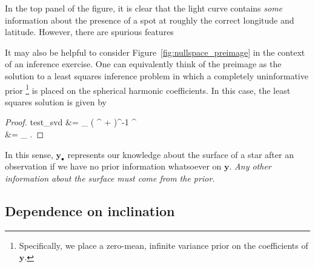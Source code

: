 \documentclass[modern]{aastex62}
\begin{document}
In the top panel of the figure, it is clear that the light curve
contains \emph{some} information about the presence of a spot at roughly the
correct longitude and latitude. However, there are spurious features


It may also be helpful to consider Figure~\ref{fig:nullspace_preimage} in the
context of an inference exercise. One can equivalently think of
the preimage as the solution to a least squares inference problem
in which a completely uninformative prior%
\footnote{%
    Specifically, we place a zero-mean, infinite variance prior on the coefficients of $\mathbf{y}$.
}
is placed on the spherical harmonic
coefficients. In this case, the least squares solution is given by
%
\begin{proof}{test_svd}
    &=
    \lim_{\lambda {}} \left( ^\top {} + \lambda {}\right)^{-1} ^\top {}
    \nonumber\\
    &= _\bullet
    \quad.
\end{proof}
%
In this sense, $\mathbf{y}_\bullet$ represents our knowledge about the
surface of a star after an observation if we have no prior information
whatsoever on $\mathbf{y}$.
\emph{Any other information about the surface must come from the prior.}%



\subsection{Dependence on inclination}
\end{document}
